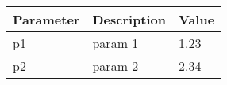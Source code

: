 \begin{tabular}{lll} 
\toprule 
Parameter & Description & Value \\ 
\midrule 
p1 & param 1 & 1.23 \\ 
p2 & param 2 & 2.34 \\ 
\bottomrule 
\end{tabular} 
